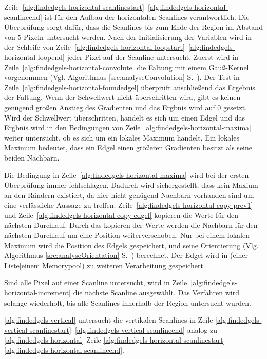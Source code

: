 Zeile~\ref{alg:findedgels-horizontal-scanlinestart}--\ref{alg:findedgels-horizontal-scanlineend} ist für den Aufbau der
 horizontalen Scanlines verantwortlich. Die Überprüfung sorgt dafür, dass die Scanlines bis zum Ende der Region im
 Abstand von $5$ Pixeln untersucht werden. Nach der Initialisierung der Variablen wird in der Schleife von
 Zeile~\ref{alg:findedgels-horizontal-loopstart}--\ref{alg:findedgels-horizontal-loopend} jeder Pixel auf der Scanline
 untersucht. Zuerst wird in Zeile~\ref{alg:findedgels-horizontal-convolute} die Faltung mit einem Gauß-Kernel
 vorgenommen (Vgl. Algorithmus \ref{src:analyseConvolution} S.~\pageref{src:analyseConvolution}). Der Test in
 Zeile~\ref{alg:findedgels-horizontal-foundedgel} überprüft anschließend das Ergebnis der Faltung. Wenn der Schwellwert
 nicht überschritten wird, gibt es keinen genügend großen Anstieg des Gradienten und das Ergbnis wird auf $0$ gesetzt.
 Wird der Schwellwert überschritten, handelt es sich um einen Edgel und das Ergbnis wird in den Bedingungen von
 Zeile~\ref{alg:findedgels-horizontal-maxima} weiter untersucht, ob es sich um ein lokales Maximum handelt. Ein lokales
 Maximum bedeutet, dass ein Edgel einen größeren Gradienten besitzt als seine beiden Nachbarn.

Die Bedingung in Zeile~\ref{alg:findedgels-horizontal-maxima} wird bei der ersten Überprüfung immer fehlschlagen.
 Dadurch wird sichergestellt, dass kein Maxium an den Rändern existiert, da hier nicht genügend Nachbarn vorhanden sind
 um eine verlässliche Aussage zu treffen. Zeile~\ref{alg:findedgels-horizontal-copy-prev1} und
 Zeile~\ref{alg:findedgels-horizontal-copy-edgel} kopieren die Werte für den nächsten Durchlauf. Durch das kopieren der
 Werte werden die Nachbarn für den nächsten Durchlauf um eine Position weiterverschoben. Nur bei einem lokalen Maximum
 wird die Position des Edgels gespeichert, und seine Orientierung (Vlg. Algorithmus \ref{src:analyseOrientation}
 S.~\pageref{src:analyseOrientation}) berechnet. Der Edgel wird in (einer Liste|einem Memorypool) zu weiteren
 Verarbeitung gespeichert.

Sind alle Pixel auf einer Scanline untersucht, wird in Zeile~\ref{alg:findedgels-horizontal-increment} die nächste
 Scanline ausgewählt. Das Verfahren wird solange wiederholt, bis alle Scanlines innerhalb der Region untersucht wurden.

\autoref{alg:findedgels-vertical} untersucht die vertikalen Scanlines in Zeile
 \ref{alg:findedgels-vertical-scanlinestart}--\ref{alg:findedgels-vertical-scanlineend} analog zu
 \autoref{alg:findedgels-horizontal} Zeile
 \ref{alg:findedgels-horizontal-scanlinestart}--\ref{alg:findedgels-horizontal-scanlineend}.


